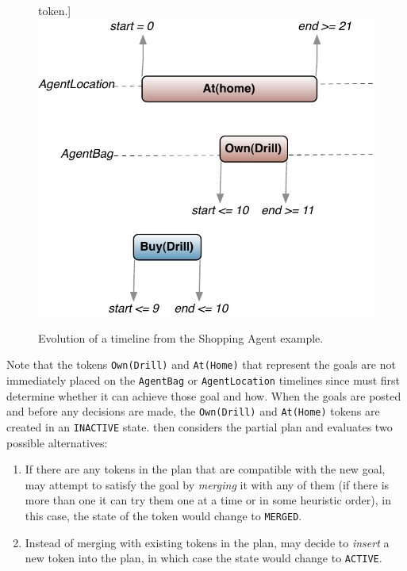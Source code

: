 \begin{description}
\begin{figure}[t]
    token.]{\label{fig:europapr:activate}\includegraphics[scale=0.35]{figs/europa-pr-activate.pdf}}
    \caption{\small Evolution of a timeline from the Shopping Agent example.}
  \end{figure}


  Note that the tokens \texttt{Own(Drill)} and \texttt{At(Home)} that
  represent the goals are not immediately placed on the
  \texttt{AgentBag} or \texttt{AgentLocation} timelines since \eu must
  first determine whether it can achieve those goal and how. When the
  goals are posted and before any decisions are made, the
  \texttt{Own(Drill)} and \texttt{At(Home)} tokens are created in an
  \texttt{INACTIVE} state. \eu then considers the partial plan and
  evaluates two possible alternatives:

\begin{enumerate}

\item If there are any tokens in the plan that are compatible with the
  new goal, \eu may attempt to satisfy the goal by \emph{merging} it
  with any of them (if there is more than one it can try them one at a
  time or in some heuristic order), in this case, the state of the
  token would change to \texttt{MERGED}.

\item Instead of merging with existing tokens in the plan, \eu may
  decide to \emph{insert} a new token into the plan, in which case the
  state would change to \texttt{ACTIVE}.


\end{enumerate}
\end{description}
